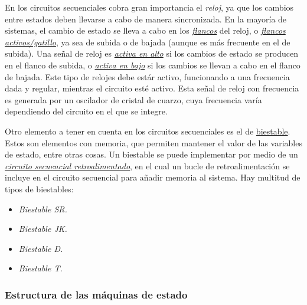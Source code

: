 En los circuitos secuenciales cobra gran importancia el \emph{reloj}, ya que los cambios entre estados deben llevarse a cabo de manera sincronizada. En la mayoría de sistemas, el cambio de estado se lleva a cabo en los \hyperlink{edge}{\emph{flancos}} del reloj, o \hyperlink{active_edge}{\emph{flancos activos/gatillo}}, ya sea de subida o de bajada (aunque es más frecuente en el de subida). Una señal de reloj es \hyperlink{active_high}{\emph{activa en alto}} si los cambios de estado se producen en el flanco de subida, o \hyperlink{active_low}{\emph{activa en bajo}} si los cambios se llevan a cabo en el flanco de bajada. Este tipo de relojes debe estár activo, funcionando a una frecuencia dada y regular, mientras el circuito esté activo. Esta señal de reloj con frecuencia es generada por un oscilador de cristal de cuarzo, cuya frecuencia varía dependiendo del circuito en el que se integre.

Otro elemento a tener en cuenta en los circuitos secuenciales es el de \hyperlink{flip-flop}{biestable}. Estos son elementos con memoria, que permiten mantener el valor de las variables de estado, entre otras cosas. Un biestable se puede implementar por medio de un \hyperlink{feedback_sequential_circuit}{\emph{circuito secuencial retroalimentado}}, en el cual un bucle de retroalimentación se incluye en el circuito secuencial para añadir memoria al sistema. Hay multitud de tipos de biestables:

\begin{itemize}
    \item \emph{Biestable SR.}
    \item \emph{Biestable JK.}
    \item \emph{Biestable D.}
    \item \emph{Biestable T.}
\end{itemize}

\subsubsection{Estructura de las máquinas de estado}


